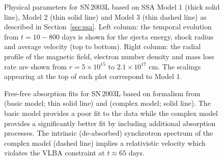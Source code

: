 \documentclass[12pt,preprint]{aastex}
\begin{document}
\clearpage

\begin{figure}
\bigskip
\bigskip
\caption{Physical parameters for SN\,2003L based on SSA Model 1 (thick
solid line), Model 2 (thin solid line) and Model 3 (thin dashed line)
as described in Section~\ref{sec:ssa}.  Left column: the temporal
evolution from $t=10 - 800$ days is shown for the ejecta energy, shock
radius and average velocity (top to bottom).  Right column: the radial
profile of the magnetic field, electron number density and mass loss
rate are shown from $r=5\times 10^{15}$ to $2.1\times 10^{17}$ cm.
The scalings appearing at the top of each plot correspond to Model 1.
\label{fig:params}}
\end{figure}

\clearpage

\begin{figure}
\bigskip
\bigskip
\caption{Free-free absorption fits for SN\,2003L based on formalism
from \citet{wsp+86} (basic model; thin solid line) and \citet{wpm01}
(complex model; solid line).  The basic model provides a poor fit to
the data while the complex model provides a significantly better fit
by including additional absorption processes.  The intrinsic (de-absorbed)
synchrotron spectrum of the complex model (dashed line)
implies a relativistic velocity which violates the VLBA constraint at 
$t\approx 65$ days.
\label{fig:ffa}}
\end{figure}
\end{document}
